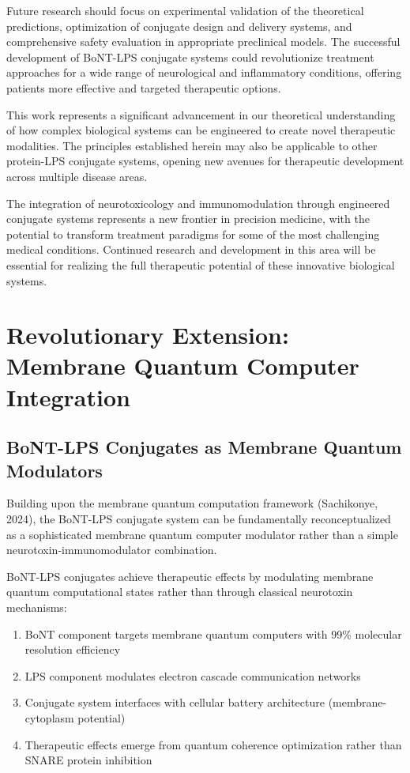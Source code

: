 \documentclass[11pt,a4paper]{article}
\begin{document}
Future research should focus on experimental validation of the theoretical predictions, optimization of conjugate design and delivery systems, and comprehensive safety evaluation in appropriate preclinical models. The successful development of BoNT-LPS conjugate systems could revolutionize treatment approaches for a wide range of neurological and inflammatory conditions, offering patients more effective and targeted therapeutic options.

This work represents a significant advancement in our theoretical understanding of how complex biological systems can be engineered to create novel therapeutic modalities. The principles established herein may also be applicable to other protein-LPS conjugate systems, opening new avenues for therapeutic development across multiple disease areas.

The integration of neurotoxicology and immunomodulation through engineered conjugate systems represents a new frontier in precision medicine, with the potential to transform treatment paradigms for some of the most challenging medical conditions. Continued research and development in this area will be essential for realizing the full therapeutic potential of these innovative biological systems.

\section{Revolutionary Extension: Membrane Quantum Computer Integration}

\subsection{BoNT-LPS Conjugates as Membrane Quantum Modulators}

Building upon the membrane quantum computation framework (Sachikonye, 2024), the BoNT-LPS conjugate system can be fundamentally reconceptualized as a sophisticated membrane quantum computer modulator rather than a simple neurotoxin-immunomodulator combination.

\begin{theorem}
BoNT-LPS conjugates achieve therapeutic effects by modulating membrane quantum computational states rather than through classical neurotoxin mechanisms:
\begin{enumerate}
\item BoNT component targets membrane quantum computers with 99\% molecular resolution efficiency
\item LPS component modulates electron cascade communication networks
\item Conjugate system interfaces with cellular battery architecture (membrane-cytoplasm potential)
\item Therapeutic effects emerge from quantum coherence optimization rather than SNARE protein inhibition
\end{enumerate}
\end{theorem}
\end{document}

